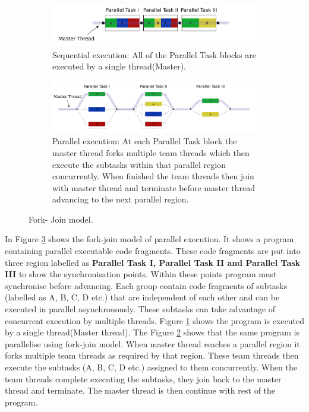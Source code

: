 \begin{figure}[!htb]
	\centering
	\begin{subfigure}[b]{\textwidth}
  		\includegraphics[width=\textwidth]{figs/fork_join_a.png}
  		\caption{Sequential execution: All of the Parallel Task blocks are executed by a single thread(Master).}
  		\label{fig:fork_join_a}
	\end{subfigure}
	\begin{subfigure}[b]{\textwidth}
  		\includegraphics[width=\textwidth]{figs/fork_join_b.png}
  		\caption{Parallel execution: At each Parallel Task block the master thread forks multiple team threads which then execute the subtasks within that parallel region concurrently.  When finished the team threads then join with master thread and terminate before master thread advancing to the next parallel region.}
  		\label{fig:fork_join_b}
	\end{subfigure}
	\caption{Fork- Join model. \citep{A1:fork-join}}
  	\label{fig:fork-join}
\end{figure}

In Figure \ref{fig:fork-join} shows the fork-join model of parallel execution. It shows a program containing parallel executable code fragments. These code fragments are put into three region labelled as \textbf{Parallel Task I, Parallel Task II and Parallel Task III} to show the synchronisation points. Within these points program must synchronise before advancing. Each group contain code fragments of subtasks (labelled as A, B, C, D etc.) that are independent of each other and can be executed in parallel asynchronously. These subtasks can take advantage of concurrent execution by multiple threads. Figure \ref{fig:fork_join_a} shows the program is executed by a single thread(Master thread). The Figure \ref{fig:fork_join_b} shows that the same program is parallelise using fork-join model. When master thread reaches a parallel region it forks multiple team threads as required by that region. These team threads then execute the subtasks (A, B, C, D etc.) assigned to them concurrently. When the team threads complete executing the subtasks, they join back to the master thread and terminate. The master thread is then continue with rest of the program.

